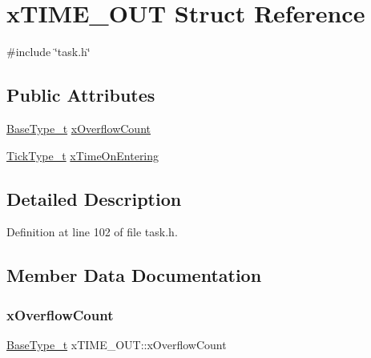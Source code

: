\hypertarget{structxTIME__OUT}{}\section{x\+T\+I\+M\+E\+\_\+\+O\+UT Struct Reference}
\label{structxTIME__OUT}


{\ttfamily \#include \char`\"{}task.\+h\char`\"{}}

\subsection*{Public Attributes}
\begin{DoxyCompactItemize}
\item 
\hyperlink{pic32mx_2portmacro_8h_a46fb21e00ae0729d7515c0fbf2269796}{Base\+Type\+\_\+t} \hyperlink{structxTIME__OUT_a9289c6f97096a9b3e3fc705d0bc5a160}{x\+Overflow\+Count}
\item 
\hyperlink{pic32mx_2portmacro_8h_aa69c48c6e902ce54f70886e6573c92a9}{Tick\+Type\+\_\+t} \hyperlink{structxTIME__OUT_a3464939ca050f7bcc6ffe0d8d3766337}{x\+Time\+On\+Entering}
\end{DoxyCompactItemize}


\subsection{Detailed Description}


Definition at line 102 of file task.\+h.



\subsection{Member Data Documentation}
\mbox{\label{structxTIME__OUT_a9289c6f97096a9b3e3fc705d0bc5a160}} 
\subsubsection{\texorpdfstring{x\+Overflow\+Count}{xOverflowCount}}
{\footnotesize\ttfamily \hyperlink{pic32mx_2portmacro_8h_a46fb21e00ae0729d7515c0fbf2269796}{Base\+Type\+\_\+t} x\+T\+I\+M\+E\+\_\+\+O\+U\+T\+::x\+Overflow\+Count}



